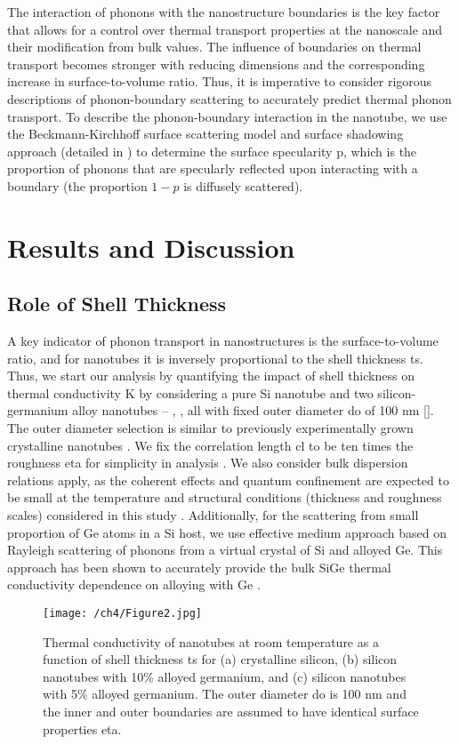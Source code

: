 The interaction of phonons with the nanostructure boundaries is the key factor that allows for a control over thermal transport properties at the nanoscale and their modification from bulk values. The influence of boundaries on thermal transport becomes stronger with reducing dimensions and the corresponding increase in surface-to-volume ratio. Thus, it is imperative to consider rigorous descriptions of phonon-boundary scattering to accurately predict thermal phonon transport. To describe the phonon-boundary interaction in the nanotube, we use the Beckmann-Kirchhoff surface scattering model and surface shadowing approach (detailed in ) to determine the surface specularity \gls{p}, which is the proportion of phonons that are specularly reflected upon interacting with a boundary (the proportion $1-p$ is diffusely scattered).

\section{Results and Discussion}
\subsection{Role of Shell Thickness}
A key indicator of phonon transport in nanostructures is the surface-to-volume ratio, and for nanotubes it is inversely proportional to the shell thickness \gls{ts}. Thus, we start our analysis by quantifying the impact of shell thickness on thermal conductivity \gls{K} by considering a pure Si nanotube and two silicon-germanium alloy nanotubes -- , , all with fixed outer diameter \gls{do} of 100 nm []. The outer diameter selection is similar to previously experimentally grown crystalline nanotubes \cite{RN436}. We fix the correlation length \gls{cl} to be ten times the roughness \gls{eta} for simplicity in analysis \cite{ownNW}.  We also consider bulk dispersion relations apply, as the coherent effects and quantum confinement are expected to be small at the temperature and structural conditions (thickness and roughness scales) considered in this study \cite{RN240,RN447}. Additionally, for the scattering from small proportion of Ge atoms in a Si host, we use effective medium approach based on Rayleigh scattering of phonons from a virtual crystal of Si and alloyed Ge. This approach has been shown to accurately provide the bulk SiGe thermal conductivity dependence on alloying with Ge \cite{RN132,RN289}. 

\begin{figure}[hbt]
	\centering \texttt{[image: /ch4/Figure2.jpg]}
	\caption{Thermal conductivity of nanotubes at room temperature as a function of shell thickness \gls{ts} for (a) crystalline silicon, (b) silicon nanotubes with 10\% alloyed germanium, and (c) silicon nanotubes with 5\% alloyed germanium. The outer diameter \gls{do} is 100 nm and the inner and outer boundaries are assumed to have identical surface properties \gls{eta}.}
	\label{fig:nt_fig2}
\end{figure}

